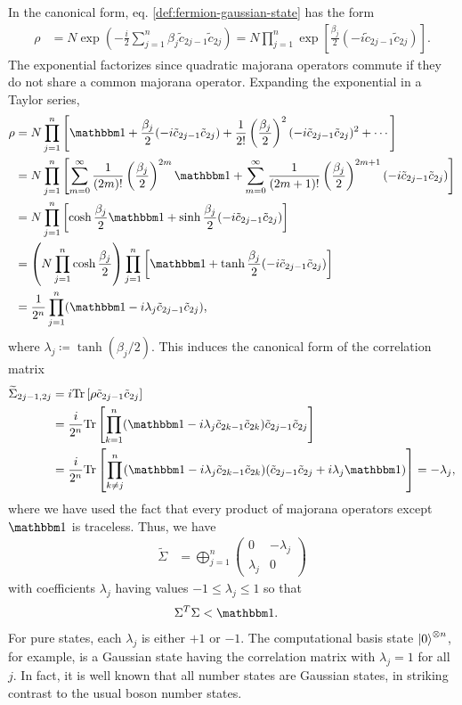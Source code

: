 \noindent In the canonical form, eq. \eqref{def:fermion-gaussian-state} has the form
\begin{align}
\rho &= N\exp \left( -\frac{i}{2} \sum_{j=1}^n \beta_j \tilde{c}_{2j-1} \tilde{c}_{2j} \right)
= N\prod_{j=1}^n \exp \left[ \frac{\beta_j}{2} (-i\tilde{c}_{2j-1} \tilde{c}_{2j}) \right].
\end{align}
The exponential factorizes since quadratic majorana operators commute if they do not share a common majorana operator. Expanding the exponential in a Taylor series,
\begin{align}
\rho & = N\prod_{j=1}^n \left[ \id + \frac{\beta_j}{2} (-i\tilde{c}_{2j-1} \tilde{c}_{2j}) + \frac{1}{2!} \left( \frac{\beta_j}{2} \right)^2 (-i\tilde{c}_{2j-1} \tilde{c}_{2j})^2 + \cdots \right] \nonumber \\
& = N\prod_{j=1}^n \left[ \sum_{m=0}^{\infty} \frac{1}{(2m)!} \left( \frac{\beta_j}{2} \right)^{2m} \id +\sum_{m=0}^{\infty} \frac{1}{(2m+1)!} \left( \frac{\beta_j}{2} \right)^{2m+1} (-i\tilde{c}_{2j-1} \tilde{c}_{2j})  \right] \nonumber \\
& = N\prod_{j=1}^n \left[ \cosh \frac{\beta_j}{2} \id + \sinh \frac{\beta_j}{2} (-i\tilde{c}_{2j-1} \tilde{c}_{2j}) \right] \nonumber \\
& = \left( N\prod_{j=1}^n \cosh \frac{\beta_j}{2} \right) \prod_{j=1}^n \left[ \id + \tanh \frac{\beta_j}{2} (-i\tilde{c}_{2j-1} \tilde{c}_{2j}) \right] \nonumber \\
& = \frac{1}{2^n} \prod_{j=1}^n ( \id - i \lambda_j \tilde{c}_{2j-1} \tilde{c}_{2j} ),
\end{align}
where $\lambda_j \coloneqq \tanh (\beta_j/2)$. This induces the canonical form of the correlation matrix
\begin{align}
	\widetilde\Sigma_{2j-1,2j} &= i \Tr \left[ \rho \tilde{c}_{2j-1} \tilde{c}_{2j} \right] \nonumber \\
		&= \frac{i}{2^n} \Tr \left[ \prod_{k=1}^n (\id - i\lambda_j \tilde{c}_{2k-1} \tilde{c}_{2k}) \tilde{c}_{2j-1} \tilde{c}_{2j} \right] \nonumber \\
		&= \frac{i}{2^n} \Tr \left[ \prod_{k\neq j}^n (\id - i\lambda_j \tilde{c}_{2k-1} \tilde{c}_{2k}) (\tilde{c}_{2j-1}\tilde{c}_{2j} + i\lambda_j \id) \right] = -\lambda_j,
\end{align}
where we have used the fact that every product of majorana operators except $\id$ is traceless.
Thus, we have
\begin{align}
	\widetilde\Sigma &=
		\bigoplus_{j=1}^n \left( \begin{array}{cc} 0 & -\lambda_j \\ \lambda_j & 0 \end{array} \right)
\end{align}
with coefficients $\lambda_j$ having values $-1\le \lambda_j \le 1$ so that
\begin{align}
	\Sigma^T \Sigma &< \id.
\end{align}
For pure states, each $\lambda_j$ is either $+1$ or $-1$. The computational basis state ${\left\vert{0}\right\rangle}^{\otimes n}$, for example, is a Gaussian state having the correlation matrix with $\lambda_j =1$ for all $j$. In fact, it is well known that all number states are Gaussian states, in striking contrast to the usual boson number states.

